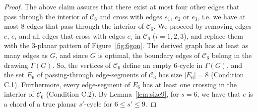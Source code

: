 \begin{proof}
The above claim assures that there exist at most four other edges that pass through the interior of $\mathcal{C}_6$ and cross with edges $e_1$, $e_2$ or $e_3$, i.e. we have at most $8$ edges that pass through the interior of $\mathcal{C}_6$. We proceed by removing edges $e$, $e_i$ and all edges that cross with edges $e_i$ in  $\mathcal{C}_6$ ($i=1,2,3$), and replace them with the $3$-planar pattern of Figure~\ref{fig:6gon}. The derived graph has at least as many edges as $G$, and since $G$ is optimal, the boundary edges of $\mathcal{C}_6$ belong in the drawing $\Gamma(G)$. So, the vertices of $\mathcal{C}_6$ define an empty $6$-cycle in $\Gamma(G)$, and the set $E_6$ of passing-through edge-segments of $\mathcal{C}_6$ has size $|E_6|=8$ (Condition C.1). Furthermore, every edge-segment of $E_6$ has at least one crossing in the interior of $\mathcal{C}_6$ (Condition C.2). By Lemma~\ref{lem:size9}, for $s=6$, we have that $e$ is a chord of a true planar $s'$-cycle for $6\leq s'\leq 9$.
\end{proof}

